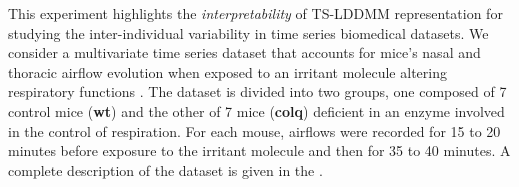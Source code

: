 

This experiment highlights the \textit{interpretability} of TS-LDDMM representation for studying the inter-individual variability in time series biomedical datasets. We consider a multivariate time series dataset that accounts for mice's nasal and thoracic airflow evolution when exposed to an irritant molecule altering respiratory functions \cite{nervo2019respiratory}.
The dataset is divided into two groups, one composed of 7 control mice (\textbf{wt}) and the other of 7 mice (\textbf{colq}) deficient in an enzyme involved in the control of respiration. For each mouse, airflows were recorded for 15 to 20 minutes before exposure to the irritant molecule and then for 35 to 40 minutes. A complete 
description of the dataset is given in the .

